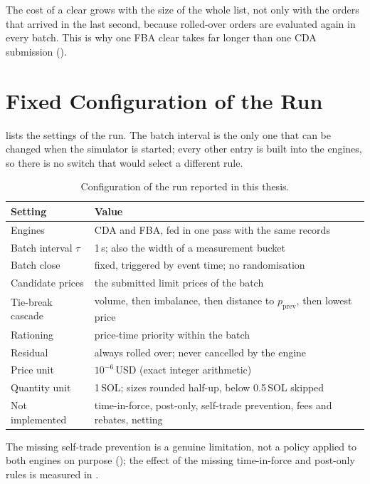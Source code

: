 The cost of a clear grows with the size of the whole list, not only with the
orders that arrived in the last second, because rolled-over orders are
evaluated again in every batch. This is why one FBA clear takes far longer
than one CDA submission ().

\section{Fixed Configuration of the Run}
\label{sec:implconfig}

 lists the settings of the run. The batch interval is the
only one that can be changed when the simulator is started; every other
entry is built into the engines, so there is no switch that would select a
different rule.

\begin{table}[htbp]
\centering
\caption[Engine configuration]{Configuration of the run reported in this
thesis.}
\label{tab:config}
\small
\begin{tabularx}{\textwidth}{@{}p{4.2cm} L@{}}
\toprule
\textbf{Setting} & \textbf{Value}\\
\midrule
Engines & CDA and FBA, fed in one pass with the same records\\
Batch interval $\tau$ & 1\,s; also the width of a measurement bucket\\
Batch close & fixed, triggered by event time; no randomisation\\
Candidate prices & the submitted limit prices of the batch\\
Tie-break cascade & volume, then imbalance, then distance to $p_{\mathrm{prev}}$, then lowest price\\
Rationing & price-time priority within the batch\\
Residual & always rolled over; never cancelled by the engine\\
Price unit & $10^{-6}$\,USD (exact integer arithmetic)\\
Quantity unit & 1\,SOL; sizes rounded half-up, below 0.5\,SOL skipped\\
Not implemented & time-in-force, post-only, self-trade prevention, fees and rebates, netting\\
\bottomrule
\end{tabularx}
\end{table}

The missing self-trade prevention is a genuine limitation, not a policy
applied to both engines on purpose (); the effect of
the missing time-in-force and post-only rules is measured in
.
